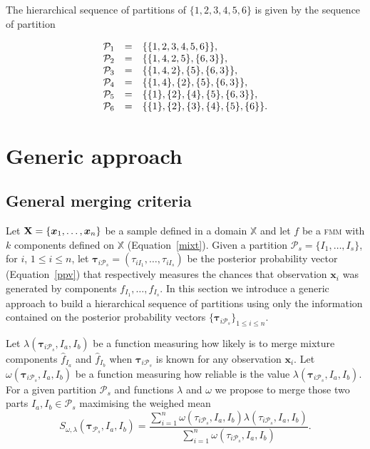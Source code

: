 \documentclass[10pt, a4paper]{article}
\newcommand{\m}[1]{\boldsymbol{#1}}
\newcommand{\fmm}{\textsc{fmm}\xspace}
\begin{document}
\begin{spacing}{1.9}
The hierarchical sequence of partitions of $\{1, 2, 3, 4, 5, 6\}$ is given by the sequence of partition

\begin{equation}
\begin{array}{r c l}
\mathcal{P}_1 &=& \{\{1, 2, 3, 4, 5, 6\}\}, \\
\mathcal{P}_2 &=& \{\{1, 4, 2, 5\}, \{6, 3\} \},  \\
\mathcal{P}_3 &=& \{\{1, 4, 2\}, \{5\}, \{6, 3\} \}, \\
\mathcal{P}_4 &=& \{\{1, 4\},\{2\}, \{5\}, \{6, 3\} \}, \\
\mathcal{P}_5 &=& \{\{1\},\{2\},\{4\},\{5\},\{6,3\} \},\\
\mathcal{P}_6 &=& \{\{1\},\{2\},\{3\},\{4\},\{5\},\{6\}\}.
\end{array}
\label{hier_ex}
\end{equation}

\section{Generic approach}\label{generic_merging}

\subsection{General merging criteria}\label{merging_criteria}

Let $\text{\textbf{X}} = \{\m x_1,\dots,\m x_n \}$ be a sample defined in  a domain $\mathbb{X}$ and let $f$ be a \fmm with $k$ components defined on $\mathbb{X}$ (Equation~\ref{mixt}). Given a partition $\mathcal{P}_s = \{I_1, \dots, I_s\}$, for $i$, $1\leq i \leq n $, let $\m\tau_{i \mathcal{P}_s}= \left( \tau_{i I_1} , \dots, \tau_{i I_s}  \right)$ be the posterior probability vector (Equation~\ref{ppv}) that respectively measures the chances that observation $\m x_i$ was generated by components $f_{I_1}, \dots, f_{I_s}$. In this section we introduce a generic approach to build a hierarchical sequence of partitions using only the information contained on the posterior probability vectors $\{\m\tau_{i \mathcal{P}_s}\}_{1\leq i \leq n}$.


Let $\lambda(\m\tau_{i \mathcal{P}_s},  I_a,  I_b)$ be a function measuring how likely is to merge mixture components $\hat{f}_{I_a}$ and $\hat{f}_{I_b}$ when $\m \tau_{i \mathcal{P}_s}$ is known for any observation $\m x_i$. Let $\omega(\m\tau_{i \mathcal{P}_s},  I_a,  I_b)$ be a function measuring how reliable is the value $\lambda(\m\tau_{i \mathcal{P}_s},  I_a,  I_b)$.  For a given partition $\mathcal{P}_s$ and functions $\lambda$ and $\omega$ we propose to merge those two parts $I_a, I_b \in \mathcal{P}_s$ maximising the weighed mean
\begin{equation}\label{unifying_equation}
S_{\omega, \lambda}( \m\tau_{\mathcal{P}_s},  I_a,  I_b) = \frac{\sum_{i=1}^n \omega(\tau_{i \mathcal{P}_s}, I_a, I_b) \lambda(\tau_{i \mathcal{P}_s}, I_a, I_b)}{\sum_{i=1}^n \omega(\tau_{i \mathcal{P}_s}, I_a, I_b) }.
\end{equation}



\end{spacing}
\end{document}
